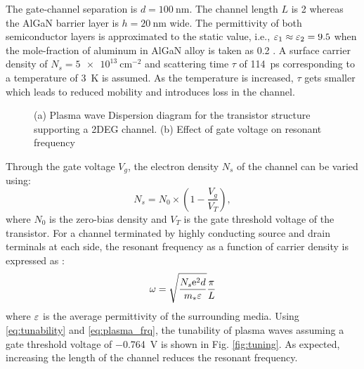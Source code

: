 \documentclass[11pt]{article}
\begin{document}
The gate-channel separation is $d = \SI{100}{\nm}$. The channel length $L$ is \SI{2}{\micm} whereas the AlGaN barrier layer is $h = \SI{20}{\nm}$ wide.
The permittivity of both semiconductor layers is approximated to the static value, i.e., $\varepsilon_1 \approx \varepsilon_2 = 9.5$ when the mole-fraction of aluminum in AlGaN alloy is taken as \SI{.2}{} \cite{Muravjov2010}. A surface carrier density of $N_s = \SI{5e13}{\cm^{-2}}$ and scattering time $\tau$ of \SI{114}{\ps} corresponding to a temperature of \SI{3}{\kelvin} is assumed. As the temperature is increased, $\tau$ gets smaller which leads to reduced mobility and introduces loss in the channel.
%
\begin{figure}[t!]
      \hfil
  \caption{(a) Plasma wave Dispersion diagram for the transistor structure supporting a 2DEG channel. (b) Effect of gate voltage on resonant frequency}
  \label{fig:matlab_simulation}
\end{figure}
%
Through the gate voltage $V_g$, the electron density $N_s$ of the channel can be varied using:
%
\begin{equation}
  N_s = N_0 \times \left(1 - \frac{V_g}{V_T} \right),
  \label{eq:tunability}
\end{equation}
%
where $N_0$ is the zero-bias density and $V_T$ is the gate threshold voltage of the transistor. For a channel terminated by highly conducting source and drain terminals at each side, the resonant frequency as a function of carrier density is expressed as \cite{Popov2008}:
%
\begin{equation}
  \omega = \sqrt{\frac{N_s \mathrm{e}^2 d}{m_{\ast} \varepsilon}} \frac{\pi}{L}
  \label{eq:plasma_frq}
\end{equation}
%
where $\varepsilon$ is the average permittivity of the surrounding media. Using \eqref{eq:tunability} and \eqref{eq:plasma_frq}, the tunability of plasma waves assuming a gate threshold voltage of \SI{-.764}{\volt} is shown in Fig. \ref{fig:tuning}. As expected, increasing the length of the channel reduces the resonant frequency.
%
%
%
\end{document}
